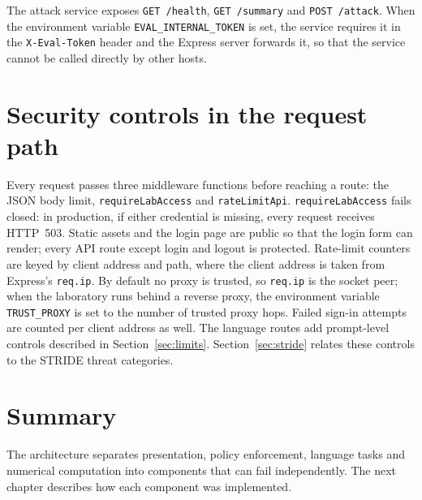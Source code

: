 The attack service exposes \texttt{GET /health}, \texttt{GET /summary} and \texttt{POST /attack}. When the environment variable \texttt{EVAL\_INTERNAL\_TOKEN} is set, the service requires it in the \texttt{X-Eval-Token} header and the Express server forwards it, so that the service cannot be called directly by other hosts.

\section{Security controls in the request path}
\label{sec:arch-sec}

Every request passes three middleware functions before reaching a route: the JSON body limit, \texttt{requireLabAccess} and \texttt{rateLimitApi}. \texttt{requireLabAccess} fails closed: in production, if either credential is missing, every request receives HTTP~503. Static assets and the login page are public so that the login form can render; every API route except login and logout is protected. Rate-limit counters are keyed by client address and path, where the client address is taken from Express's \texttt{req.ip}. By default no proxy is trusted, so \texttt{req.ip} is the socket peer; when the laboratory runs behind a reverse proxy, the environment variable \texttt{TRUST\_PROXY} is set to the number of trusted proxy hops. Failed sign-in attempts are counted per client address as well. The language routes add prompt-level controls described in Section~\ref{sec:limits}. Section~\ref{sec:stride} relates these controls to the STRIDE threat categories.

\section{Summary}

The architecture separates presentation, policy enforcement, language tasks and numerical computation into components that can fail independently. The next chapter describes how each component was implemented.
